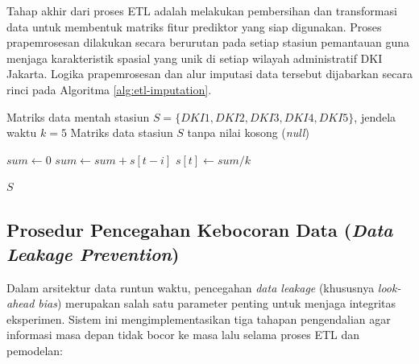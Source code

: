 Tahap akhir dari proses ETL adalah melakukan pembersihan dan transformasi data untuk membentuk matriks fitur prediktor yang siap digunakan. Proses prapemrosesan dilakukan secara berurutan pada setiap stasiun pemantauan guna menjaga karakteristik spasial yang unik di setiap wilayah administratif DKI Jakarta. Logika prapemrosesan dan alur imputasi data tersebut dijabarkan secara rinci pada Algoritma \ref{alg:etl-imputation}.

\begin{algorithm}[htbp]
\caption{Algoritma Prapemrosesan dan Imputasi \textit{Rolling Mean} per Stasiun}
\label{alg:etl-imputation}
\begin{algorithmic}[1] 
\Require Matriks data mentah stasiun $S = \{DKI1, DKI2, DKI3, DKI4, DKI5\}$, jendela waktu $k = 5$
\Ensure Matriks data stasiun $S$ tanpa nilai kosong (\textit{null})

            \State $sum \gets 0$
                \State $sum \gets sum + s[t-i]$
            \EndFor
            \State $s[t] \gets sum / k$ 
        \EndIf
    \EndFor
\EndFor

\State \Return $S$
\end{algorithmic}
\end{algorithm}

\subsection{Prosedur Pencegahan Kebocoran Data (\textit{Data Leakage Prevention})}
Dalam arsitektur data runtun waktu, pencegahan \textit{data leakage} (khususnya \textit{look-ahead bias}) merupakan salah satu parameter penting untuk menjaga integritas eksperimen. Sistem ini mengimplementasikan tiga tahapan pengendalian agar informasi masa depan tidak bocor ke masa lalu selama proses ETL dan pemodelan:

